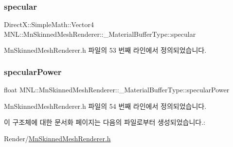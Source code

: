 \subsubsection{\texorpdfstring{specular}{specular}}
{\footnotesize\ttfamily Direct\+X\+::\+Simple\+Math\+::\+Vector4 M\+N\+L\+::\+Mn\+Skinned\+Mesh\+Renderer\+::\+\_\+\+Material\+Buffer\+Type\+::specular}



Mn\+Skinned\+Mesh\+Renderer.\+h 파일의 53 번째 라인에서 정의되었습니다.

\mbox{\label{struct_m_n_l_1_1_mn_skinned_mesh_renderer_1_1___material_buffer_type_adf39c878cd0b12017cd7b1bf3afbdfe2}} 
\subsubsection{\texorpdfstring{specular\+Power}{specularPower}}
{\footnotesize\ttfamily float M\+N\+L\+::\+Mn\+Skinned\+Mesh\+Renderer\+::\+\_\+\+Material\+Buffer\+Type\+::specular\+Power}



Mn\+Skinned\+Mesh\+Renderer.\+h 파일의 54 번째 라인에서 정의되었습니다.



이 구조체에 대한 문서화 페이지는 다음의 파일로부터 생성되었습니다.\+:\begin{DoxyCompactItemize}
\item 
Render/\hyperlink{_mn_skinned_mesh_renderer_8h}{Mn\+Skinned\+Mesh\+Renderer.\+h}\end{DoxyCompactItemize}
